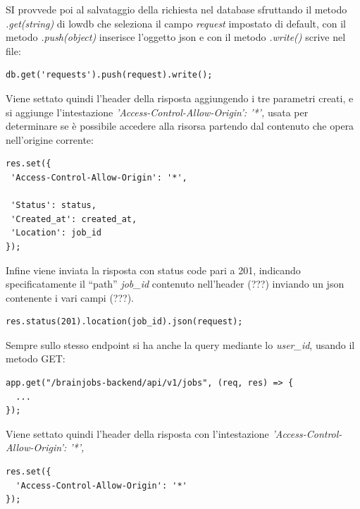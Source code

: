 \documentclass[a4paper,12pt, oneside]{book}
\begin{document}
SI provvede poi al salvataggio della richiesta nel database sfruttando il metodo \textit{.get(string)} di lowdb che seleziona il campo \textit{request} impostato di default, con il metodo \textit{.push(object)} inserisce l'oggetto json e con il metodo \textit{.write()} scrive nel file:
\begin{shaded} 
\begin{verbatim}
db.get('requests').push(request).write();
\end{verbatim}
\end{shaded}
Viene settato quindi l'header della risposta aggiungendo i tre parametri creati,
e si aggiunge l'intestazione \textit{'Access-Control-Allow-Origin': '*',} usata per determinare
se è possibile accedere alla risorsa partendo dal contenuto che opera nell'origine corrente:
\begin{shaded} 
\begin{verbatim}
res.set({
 'Access-Control-Allow-Origin': '*',
    
 'Status': status,
 'Created_at': created_at,
 'Location': job_id
});              
\end{verbatim}
\end{shaded}
Infine viene inviata la risposta con status code pari a 201, indicando specificatamente il ``path'' \textit{job\_id} contenuto nell'header (???) inviando un json contenente i vari campi (???).\\
\begin{shaded} 
\begin{verbatim}
res.status(201).location(job_id).json(request);              
\end{verbatim}
\end{shaded}
Sempre sullo stesso endpoint si ha anche la query mediante lo \textit{user\_id}, usando il metodo GET:
\begin{shaded} 
\begin{verbatim}
app.get("/brainjobs-backend/api/v1/jobs", (req, res) => {
  ...
});
\end{verbatim}
\end{shaded}
Viene settato quindi l'header della risposta con l'intestazione \textit{'Access-Control-Allow-Origin': '*',}
\begin{shaded} 
\begin{verbatim}
res.set({
  'Access-Control-Allow-Origin': '*'                
});
\end{verbatim}
\end{shaded}
\end{document}
